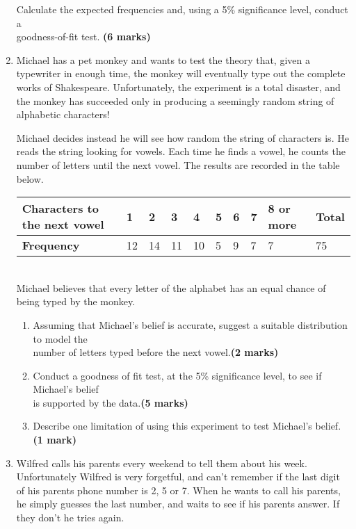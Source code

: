 \documentclass[fleqn]{article}
\begin{document}
\begin{enumerate}
        Calculate the expected frequencies and, using a 5\% significance level, conduct a \\goodness-of-fit test. \hfill\textbf{(6 marks)}
    \newpage
    \item Michael has a pet monkey and wants to test the theory that, given a typewriter in enough time, the monkey will eventually type out the complete works of Shakespeare. Unfortunately, the experiment is a total disaster, and the monkey has succeeded only in producing a seemingly random string of alphabetic characters!
        
        Michael decides instead he will see how random the string of characters is. He reads the string looking for vowels. Each time he finds a vowel, he counts the number of letters until the next vowel. The results are recorded in the table below.\vspace{3mm}\\
        \begin{tabularx}{0.9\textwidth}{|X|*7{P{7mm}|}P{16mm}|P{12mm}|}
            \hline
            \textbf{Characters to the next vowel} & 1  & 2  & 3  & 4  & 5 & 6 & 7 & 8 or more & \textbf{Total}  \\\hline
            \textbf{Frequency}                    & 12 & 14 & 11 & 10 & 5 & 9 & 7 & 7         & 75              \\\hline
        \end{tabularx}\vspace{3mm}\\

        Michael believes that every letter of the alphabet has an equal chance of being typed by the monkey.
        \begin{enumerate}[label=\bfseries \alph*\space ]
            \item Assuming that Michael's belief is accurate, suggest a suitable distribution to model the \\number of letters typed before the next vowel.\hfill\textbf{(2 marks)}
            \item Conduct a goodness of fit test, at the 5\% significance level, to see if Michael's belief\\ is supported by the data.\hfill\textbf{(5 marks)}
            \item Describe one limitation of using this experiment to test Michael's belief. \hfill\textbf{(1 mark)}
        \end{enumerate}
    \item Wilfred calls his parents every weekend to tell them about his week. Unfortunately Wilfred is very forgetful, and can't remember if the last digit of his parents phone number is 2, 5 or 7. When he wants to call his parents, he simply guesses the last number, and waits to see if his parents answer. If they don't he tries again.
    

\end{enumerate}
\end{document}
